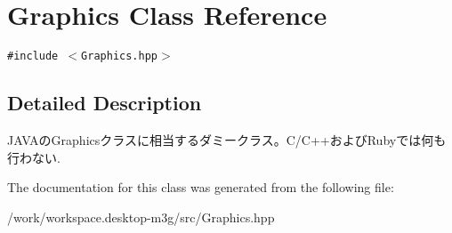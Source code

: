 \hypertarget{classm3g_1_1Graphics}{
\section{Graphics Class Reference}
\label{classm3g_1_1Graphics}
}
{\tt \#include $<$Graphics.hpp$>$}



\subsection{Detailed Description}
JAVAのGraphicsクラスに相当するダミークラス。C/C++およびRubyでは何も行わない. 

The documentation for this class was generated from the following file:\begin{CompactItemize}
\item 
/work/workspace.desktop-m3g/src/Graphics.hpp\end{CompactItemize}

